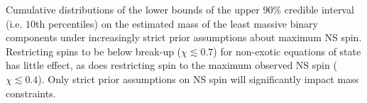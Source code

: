 \label{fig:restricted_priors} Cumulative distributions of the lower bounds of the upper $90\%$ credible interval (i.e. $10$th percentiles) on the estimated mass of the least massive binary components under increasingly strict prior assumptions about maximum NS spin.  Restricting spins to be below break-up ($\chi\lesssim0.7$) for non-exotic equations of state has little effect, as does restricting spin to the maximum observed NS spin ($\chi\lesssim0.4$).  Only strict prior assumptions on NS spin will significantly impact mass constraints.
  
  
  
  
  